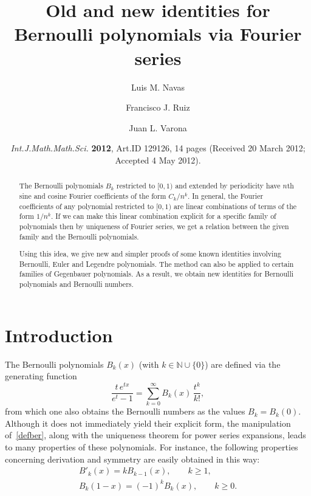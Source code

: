 \documentclass[a4paper,reqno]{amsart}
\title[Bernoulli polynomials via Fourier series]%
{Old and new identities for Bernoulli polynomials via Fourier series}
\author{Luis M. Navas}
\author{Francisco J. Ruiz}
\author{Juan L. Varona}
\date{\textit{Int.\@ J.\@ Math.\@ Math.\@ Sci.\@} \textbf{2012}, Art.\@ ID 129126, 14 pages
(Received 20 March 2012; Accepted 4 May 2012).}
\newcommand{\N}{\mathbb{N}}
\theoremstyle{plain}
\numberwithin{equation}{section}
\theoremstyle{remark}
\begin{document}
\begin{abstract}
The Bernoulli polynomials $B_k$ restricted to $[0,1)$ and extended by periodicity have $n$th sine and cosine Fourier coefficients of the form $C_k/n^k$. In general, the Fourier coefficients of any polynomial restricted to $[0,1)$ are linear combinations of terms of the form $1/n^k$. If we can make this linear combination explicit for a specific family of polynomials then by uniqueness of Fourier series, we get a relation between the given family and the Bernoulli polynomials. 

Using this idea, we give new and simpler proofs of some known identities involving Bernoulli, Euler and Legendre polynomials. The method can also be applied to certain families of Gegenbauer polynomials. As a result, we obtain new identities for Bernoulli polynomials and Bernoulli numbers. 
\end{abstract}

\maketitle

 
\section{Introduction}
\label{sec:intro}

The Bernoulli polynomials $B_k(x)$ (with $k\in\N\cup\{0\}$) are defined via the generating function
\begin{equation}
\label{defber}
  \frac{t\,e^{tx}}{e^t-1} = \sum_{k=0}^\infty B_k(x)\, \frac{t^k}{k!},
\end{equation}
from which one also obtains the Bernoulli numbers as the values $B_k = B_k(0)$.
Although it does not immediately yield their explicit form, the manipulation of~\eqref{defber}, along with the uniqueness theorem for power series expansions, leads to many properties of these polynomials. For instance, the following properties concerning derivation and symmetry are easily obtained in this way:
\begin{gather}
\label{derivacion}
  B'_k(x) = k B_{k-1}(x),
  \qquad k\geq 1,
  \\
\label{simetria}
  B_k(1-x) = (-1)^k B_k(x),
  \qquad k\geq 0.
\end{gather}
\end{document}

